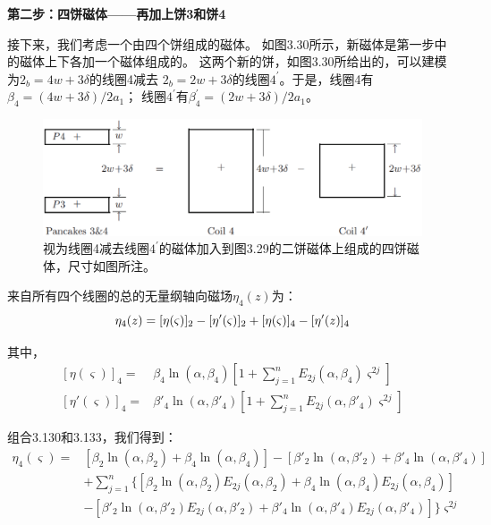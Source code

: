 \textbf{第二步：四饼磁体——再加上饼3和饼4}

接下来，我们考虑一个由四个饼组成的磁体。
如图3.30所示，新磁体是第一步中的磁体上下各加一个磁体组成的。
这两个新的饼，如图3.30所给出的，可以建模为$2_b=4w+3\delta$的线圈4减去
$2_b=2w+3\delta$的线圈$4^\prime$。于是，线圈4有$\beta_4=(4w+3\delta)/2a_1$；
线圈$4^\prime$有$\beta_4^\prime=(2w+3\delta)/2a_1$。
\begin{figure}[htbp]
	\centering
	\includegraphics[scale=0.4]{chpt3/figs/fig3.30.eps}
	\caption{视为线圈4减去线圈$4^\prime$的磁体加入到图3.29的二饼磁体上组成的四饼磁体，尺寸如图所注。}
\end{figure}

来自所有四个线圈的总的无量纲轴向磁场$\eta_4(z)$为：
\begin{equation}
\eta_{4}(z)=[\eta(\varsigma)]_{2}-[\eta'(\varsigma)]_{2}+[\eta(\varsigma)]_{4}-[\eta'(z)]_{4}\\%
\end{equation}

其中，
\begin{subequations}
	\begin{align}
{[\eta(\varsigma)]}_{4}=&\beta_{4}\ln(\alpha,\beta_{4})[1+\sum_{j=1}^{n}E_{2j}(\alpha,\beta_{4})\varsigma^{2j}]\\
{[\eta'(\varsigma)]}_{4}=&\beta'_{4}\ln(\alpha,\beta'_{4})[1+\sum_{j=1}^{n}E_{2j}(\alpha,\beta'_{4})\varsigma^{2j}]
	\end{align}
\end{subequations}

组合3.130和3.133，我们得到：
\begin{equation}
\begin{split}
\eta_{4}(\varsigma)=&[\beta_{2}\ln(\alpha,\beta_{2})+\beta_{4}\ln(\alpha,\beta_{4})]-[\beta'_{2}\ln(\alpha,\beta'_{2})+\beta'_{4}\ln(\alpha,\beta'_{4})]\\
&+\sum_{j=1}^{n}\{[\beta_{2}\ln(\alpha,\beta_{2})E_{2j}(\alpha,\beta_{2})+\beta_{4}\ln(\alpha,\beta_{4})E_{2j}(\alpha,\beta_{4})]\\
&-[\beta'_{2}\ln(\alpha,\beta'_{2})E_{2j}(\alpha,\beta'_{2})+\beta'_{4}\ln(\alpha,\beta'_{4})E_{2j}(\alpha,\beta'_{4})]\}\varsigma^{2j}%
\end{split}
\end{equation}

